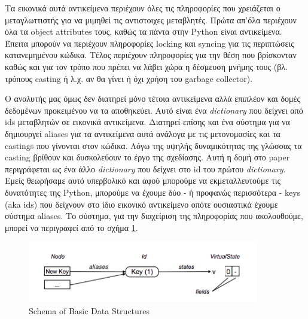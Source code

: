 Τα εικονικά αυτά αντικείμενα περιέχουν όλες τις πληροφορίες που χρειάζεται ο
μεταγλωττιστής για να μιμηθεί τις αντιστοιχες μεταβλητές. Πρώτα απ'όλα περιέχουν
όλα τα object attributes τους, καθώς τα πάντα στην Python είναι αντικείμενα.
Έπειτα μπορούν να περιέχουν πληροφορίες locking και syncing για τις περιπτώσεις
κατανεμημένου κώδικα. Τέλος περιέχουν πληροφορίες για την θέση που βρίσκονταν
καθώς και για τον τρόπο που πρέπει να λάβει χώρα η δέσμευση μνήμης τους (βλ.
τρόπους casting ή λ.χ. αν θα γίνει ή όχι χρήση του garbage collector).

Ο αναλυτής μας όμως δεν διατηρεί μόνο τέτοια αντικείμενα αλλά επιπλέον και δομές
δεδομένων προκειμένου να τα αποθηκεύει. Αυτό είναι ένα \textit{dictionary} που
δείχνει από ids μεταβλητών σε εικονικά αντικείμενα. Διατηρεί επίσης και ένα
σύστημα για να δημιουργεί aliases για τα αντικείμενα αυτά ανάλογα με τις
μετονομασίες και τα castings που γίνονται στον κώδικα. Λόγω της υψηλής
δυναμικότητας της γλώσσας τα casting βρίθουν και δυσκολεύουν το έργο της
σχεδίασης. Αυτή η δομή στο paper περιγράφεται ως ένα άλλο \textit{dictionary}
που δείχνει στο id του πρώτου \textit{dictionary}. Εμείς θεωρήσαμε αυτό
υπερβολικό και αφού μπορούμε να εκμεταλλευτούμε τις δυνατότητες της Python,
μπορούμε να έχουμε δύο - ή προφανώς περισσότερα - keys (aka ids) που δείχνουν
στο ίδιο εικονικό αντικείμενο οπότε ουσιαστικά έχουμε σύστημα aliases. Το
σύστημα, για την διαχείριση της πληροφορίας που ακολουθούμε, μπορεί να
περιγραφεί από το σχήμα \ref{figure-6}.

\begin{figure}[h]
\centering
\includegraphics[width=0.9\textwidth]{DS-schema.png}
\caption{Schema of Basic Data Structures}
\label{figure-6}
\end{figure}

